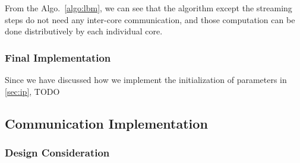From the Algo.~\ref{algo:lbm}, we can see that the algorithm except the streaming steps do not need any inter-core communication, and those computation can be done distributively by each individual core.

\subsubsection{Final Implementation}
Since we have discussed how we implement the initialization of parameters in \ref{sec:ip}, TODO


\subsection{Communication Implementation} \label{sec:ssc}
\subsubsection{Design Consideration}

